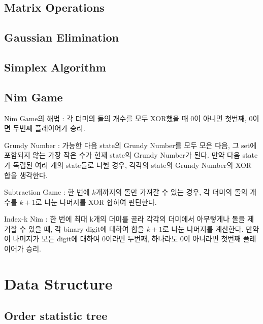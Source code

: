 \documentclass[10pt,landscape,a4paper,twocolumn]{article}
\begin{document}


\subsection{Matrix Operations}


\subsection{Gaussian Elimination}


\subsection{Simplex Algorithm}


\subsection{Nim Game}

Nim Game의 해법 : 각 더미의 돌의 개수를 모두 XOR했을 때 $0$이 아니면 첫번째, $0$이면 두번째 플레이어가 승리.

Grundy Number : 가능한 다음 state의 Grundy Number를 모두 모은 다음, 그 set에 포함되지 않는
가장 작은 수가 현재 state의 Grundy Number가 된다. 만약 다음 state가
독립된 여러 개의 state들로 나뉠 경우, 각각의 state의 Grundy Number의 XOR 합을 생각한다.

Subtraction Game : 한 번에 $k$개까지의 돌만 가져갈 수 있는 경우,
각 더미의 돌의 개수를 $k + 1$로 나눈 나머지를 XOR 합하여 판단한다.

Index-k Nim : 한 번에 최대 k개의 더미를 골라 각각의 더미에서 아무렇게나 돌을
제거할 수 있을 때, 각 binary digit에 대하여 합을 $k + 1$로 나눈 나머지를 계산한다.
만약 이 나머지가 모든 digit에 대하여 $0$이라면 두번째, 하나라도 $0$이 아니라면
첫번째 플레이어가 승리.


\section{Data Structure}

\subsection{Order statistic tree}

\end{document}
